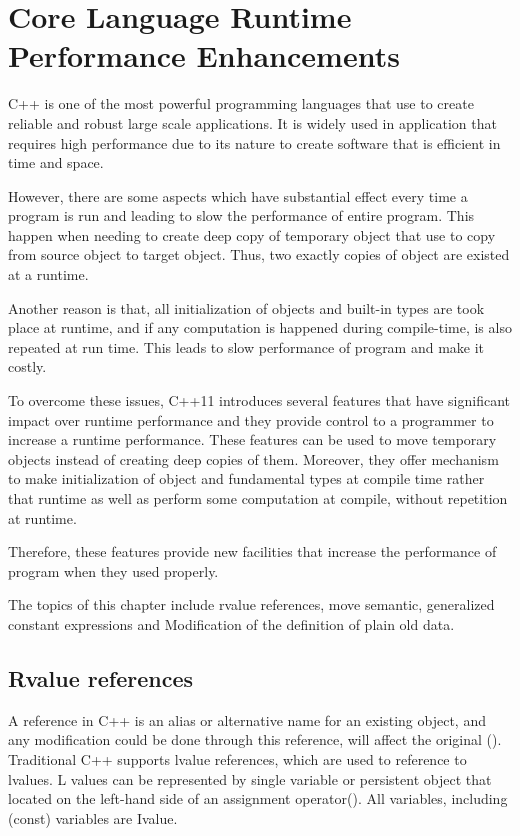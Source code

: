 \documentclass[11pt]{report}
\begin{document}


\chapter{Core Language Runtime Performance Enhancements}
\label{chapter: Runtime Performance Enhancements}
C++ is one of the most powerful programming languages that use to create reliable and robust large scale applications. It is widely used in application that requires high performance due to its nature to create software that is efficient in time and space.

However, there are some aspects which have substantial effect every time a program is run and leading to slow the performance of entire program. This happen when needing to create deep copy of temporary object that use to copy from source object to target object. Thus, two exactly copies of object are existed at a runtime.

Another reason is that, all initialization of objects and built-in types are took place at runtime, and if any computation is happened during compile-time, is also repeated at run time. This leads to slow performance of program and make it costly.

To overcome these issues, C++11 introduces several features that have significant impact over runtime performance and they provide control to a programmer to increase a runtime performance.  These features can be used to move temporary objects instead of creating deep copies of them. Moreover, they offer mechanism to make initialization of object and fundamental types at compile time rather that runtime as well as perform some computation at compile, without repetition at runtime.

Therefore, these features provide new facilities that increase the performance of program when they used properly. 

The topics of this chapter include rvalue references, move semantic, generalized constant expressions and Modification of the definition of plain old data.
\newpage

\section{Rvalue references}
\label{section: Rvalue references}
A reference in C++ is an alias or alternative name for an existing object, and any modification could be done through this reference, will affect the original (\cite{Gregorie:professionalcpp}). Traditional C++ supports lvalue references, which are used to reference to lvalues. L values can be represented by single variable or persistent object that located on the left-hand side of an assignment operator(\cite{Gregorie:professionalcpp}). All variables, including (const) variables are Ivalue.
\end{document}
